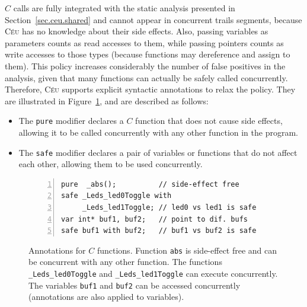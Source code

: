\documentclass[letterpaper]{sig-alternate}
\newcommand{\code}[1] {{\small{\texttt{#1}}}}
\newcommand{\CEU}{\textsc{C\'{e}u}\xspace}
\begin{document}
$C$ calls are fully integrated with the static analysis presented in
Section~\ref{sec.ceu.shared} and cannot appear in concurrent trails segments, 
because \CEU has no knowledge about their side effects.
Also, passing variables as parameters counts as read accesses to them, while 
passing pointers counts as write accesses to those types (because functions may 
dereference and assign to them).
%
This policy increases considerably the number of false positives in the 
analysis, given that many functions can actually be safely called concurrently.
Therefore, \CEU supports explicit syntactic annotations to relax the policy.
They are illustrated in Figure~\ref{lst.annotations}, and are described as 
follows:

\begin{itemize}
\item The \code{pure} modifier declares a $C$ function that does not cause side 
      effects, allowing it to be called concurrently with any other function in 
the program.
\item The \code{safe} modifier declares a pair of variables or functions that 
      do not affect each other, allowing them to be used concurrently.
\end{itemize}

%

\begin{figure}[t]
\begin{lstlisting}[numbers=left,xleftmargin=2em]
pure  _abs();          // side-effect free
safe _Leds_led0Toggle with
     _Leds_led1Toggle; // led0 vs led1 is safe
var int* buf1, buf2;   // point to dif. bufs
safe buf1 with buf2;   // buf1 vs buf2 is safe
\end{lstlisting}
\caption{ Annotations for $C$ functions. \newline
{\small %
Function \code{abs} is side-effect free and can be concurrent with any other 
function.
The functions \code{\_Leds\_led0Toggle} and \code{\_Leds\_led1Toggle} can 
execute concurrently.
The variables \code{buf1} and \code{buf2} can be accessed concurrently 
(annotations are also applied to variables).
}%
\label{lst.annotations}
}
\end{figure}

\end{document}
